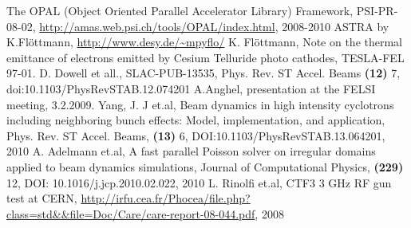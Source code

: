 \documentclass{psi-note}    %
\begin{document}
\begin{thebibliography}{9}
 The OPAL (Object Oriented Parallel Accelerator Library) Framework, PSI-PR-08-02, \url{http://amas.web.psi.ch/tools/OPAL/index.html}, 2008-2010
 ASTRA by K.Fl\"ottmann,  \url{http://www.desy.de/~mpyflo/}
 K. Fl\"ottmann, Note on the thermal emittance of electrons emitted by Cesium Telluride photo cathodes, TESLA-FEL 97-01.
 D. Dowell et all., SLAC-PUB-13535, Phys. Rev. ST Accel. Beams {\bf (12)} 7, doi:10.1103/PhysRevSTAB.12.074201
 A.Anghel, presentation at the FELSI meeting, 3.2.2009.
 Yang, J. J et.al, Beam dynamics in high intensity cyclotrons including neighboring bunch effects: Model, implementation, and application, Phys. Rev. ST Accel. Beams, {\bf (13)} 6, DOI:10.1103/PhysRevSTAB.13.064201, 2010
 A. Adelmann et.al, A fast parallel Poisson solver on irregular domains applied to beam dynamics simulations, Journal of Computational Physics, {\bf (229)} 12, DOI: 10.1016/j.jcp.2010.02.022, 2010
 L. Rinolfi et.al, CTF3 3 GHz RF gun test at CERN, \url{http://irfu.cea.fr/Phocea/file.php?class=std&&file=Doc/Care/care-report-08-044.pdf}, 2008
\end{thebibliography}
\end{document}
